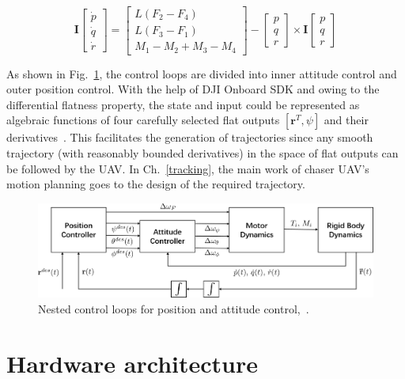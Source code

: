 \begin{equation}\label{eq:euler}
\mathbf{I}\begin{bmatrix}\dot{p}\\\dot{q}\\\dot{r}\end{bmatrix}=\begin{bmatrix}L(F_2-F_4)\\L(F_3-F_1)\\M_1-M_2+M_3-M_4\end{bmatrix}-\begin{bmatrix}p\\q\\r\end{bmatrix}\times
\mathbf{I}\begin{bmatrix}p\\q\\r\end{bmatrix}
\end{equation}

As shown in Fig.~\ref{fig:nest}, the control loops are divided into inner attitude control and outer position control. With the help of DJI Onboard SDK and owing to the differential flatness property, the state and input could be represented as algebraic functions of four carefully selected flat outputs $[\mathbf{r}^T, \psi]$ and their derivatives~\cite{Snap}. This facilitates the generation of trajectories since any smooth trajectory (with reasonably bounded derivatives) in the space of flat outputs can be followed by the UAV. In Ch.~\ref{tracking}, the main work of chaser UAV's motion planning goes to the design of the required trajectory.

\begin{figure}[htb]
  \centering
  \includegraphics[width=1.0\textwidth]{figure/chapter_2/nest.png}
  \caption{Nested control loops for position and attitude control,~\cite{GRASP}.}
  \label{fig:nest}
\end{figure}

\section{Hardware architecture}\label{hardware}

